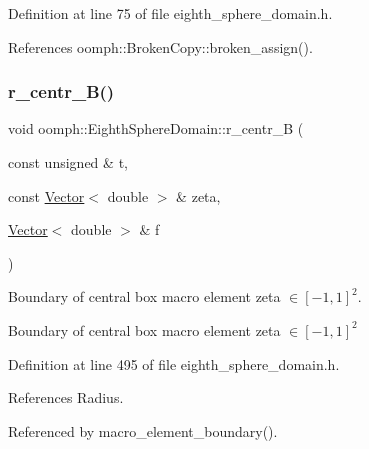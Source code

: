 Definition at line 75 of file eighth\+\_\+sphere\+\_\+domain.\+h.



References oomph\+::\+Broken\+Copy\+::broken\+\_\+assign().

\mbox{\label{classoomph_1_1EighthSphereDomain_a3ba94d9786fc6c544d82a392f8bf3dd6}} 
\subsubsection{\texorpdfstring{r\+\_\+centr\+\_\+\+B()}{r\_centr\_B()}}
{\footnotesize\ttfamily void oomph\+::\+Eighth\+Sphere\+Domain\+::r\+\_\+centr\+\_\+B (\begin{DoxyParamCaption}\item[{const unsigned \&}]{t,  }\item[{const \hyperlink{classoomph_1_1Vector}{Vector}$<$ double $>$ \&}]{zeta,  }\item[{\hyperlink{classoomph_1_1Vector}{Vector}$<$ double $>$ \&}]{f }\end{DoxyParamCaption})\hspace{0.3cm}{\ttfamily [private]}}



Boundary of central box macro element zeta $ \in [-1,1]^2 $. 

Boundary of central box macro element zeta $ \in [-1,1]^2 $ 

Definition at line 495 of file eighth\+\_\+sphere\+\_\+domain.\+h.



References Radius.



Referenced by macro\+\_\+element\+\_\+boundary().

\mbox{\label{classoomph_1_1EighthSphereDomain_aa7c38e9c33934b556f59c044654500ce}} 

